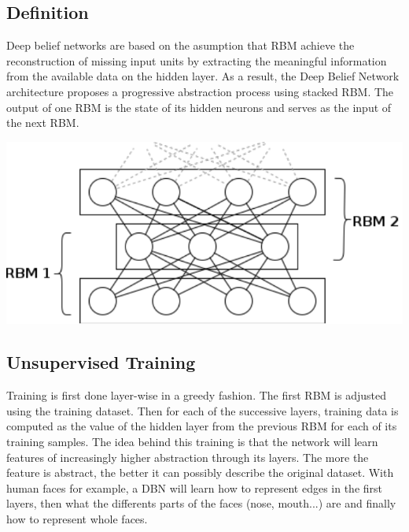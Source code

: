 \documentclass{report}
\begin{document}
	\subsection{Definition}
	
	Deep belief networks are based on the asumption that RBM achieve the 
	reconstruction of missing input units by extracting the meaningful information 
	from the available data on the hidden layer. As a result, the Deep Belief 
	Network architecture  proposes a progressive abstraction process using stacked 
	RBM. The output of one RBM is the state of its hidden neurons and serves as the 
	input of the next RBM.
	
	\vspace{1cm}
	\begin{center}
		\includegraphics[scale=0.4]{ressources/dbn}
		\vspace{0.5cm}
	\end{center}
	\vspace{0.5cm}
	
	\subsection{Unsupervised Training}
	
	Training is first done layer-wise in a greedy fashion. The first RBM is 
	adjusted using the training dataset. Then for each of the successive layers, 
	training data is computed as the value of the hidden layer from the previous 
	RBM for each of its training samples. The idea behind this training is that the 
	network will learn features of increasingly higher abstraction through its 
	layers. The more the feature is abstract, the better it can possibly describe
	the original dataset. With human faces for example, a DBN will learn how to 
	represent edges in the first layers, then what the differents parts of the 
	faces (nose, mouth...) are and finally how to represent whole faces.
	
\end{document}

